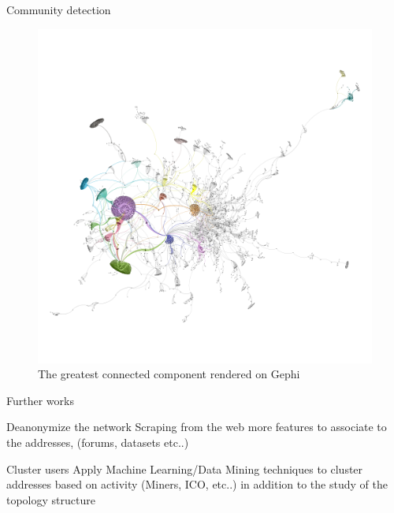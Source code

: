 \documentclass{beamer}
\begin{document}
    \begin{frame}{}
        \begin{block}{Community detection}
            \begin{figure}
                \includegraphics[scale=0.2]{gephi_1.png}
                \caption{The greatest connected component rendered on Gephi}\label{fig:gephi_1}
            \end{figure}
        \end{block}
    \end{frame}

    \begin{frame}{Further works}
        \begin{block}{Deanonymize the network}
            Scraping from the web more features to associate to the addresses, (forums, datasets etc..)
        \end{block}

        \vskip 1cm

        \begin{block}{Cluster users}
            Apply Machine Learning/Data Mining techniques to cluster addresses based on activity (Miners, ICO, etc..) in addition to the study of the topology structure
        \end{block}
    \end{frame}
\end{document}
